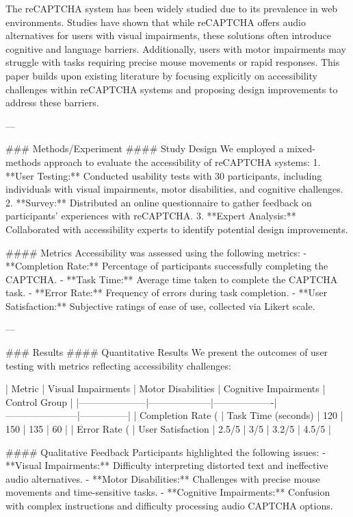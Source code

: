 The reCAPTCHA system has been widely studied due to its prevalence in web environments. Studies have shown that while reCAPTCHA offers audio alternatives for users with visual impairments, these solutions often introduce cognitive and language barriers. Additionally, users with motor impairments may struggle with tasks requiring precise mouse movements or rapid responses. This paper builds upon existing literature by focusing explicitly on accessibility challenges within reCAPTCHA systems and proposing design improvements to address these barriers.

---

### Methods/Experiment
#### Study Design
We employed a mixed-methods approach to evaluate the accessibility of reCAPTCHA systems:
1. **User Testing:** Conducted usability tests with 30 participants, including individuals with visual impairments, motor disabilities, and cognitive challenges.
2. **Survey:** Distributed an online questionnaire to gather feedback on participants’ experiences with reCAPTCHA.
3. **Expert Analysis:** Collaborated with accessibility experts to identify potential design improvements.

#### Metrics
Accessibility was assessed using the following metrics:
- **Completion Rate:** Percentage of participants successfully completing the CAPTCHA.
- **Task Time:** Average time taken to complete the CAPTCHA task.
- **Error Rate:** Frequency of errors during task completion.
- **User Satisfaction:** Subjective ratings of ease of use, collected via Likert scale.

---

### Results
#### Quantitative Results
We present the outcomes of user testing with metrics reflecting accessibility challenges:

| Metric              | Visual Impairments | Motor Disabilities | Cognitive Impairments | Control Group |
|---------------------|--------------------|-------------------|-----------------------|---------------|
| Completion Rate (%
| Task Time (seconds) | 120               | 150               | 135                   | 60            |
| Error Rate (%
| User Satisfaction   | 2.5/5            | 3/5              | 3.2/5                | 4.5/5         |

#### Qualitative Feedback
Participants highlighted the following issues:
- **Visual Impairments:** Difficulty interpreting distorted text and ineffective audio alternatives.
- **Motor Disabilities:** Challenges with precise mouse movements and time-sensitive tasks.
- **Cognitive Impairments:** Confusion with complex instructions and difficulty processing audio CAPTCHA options.


